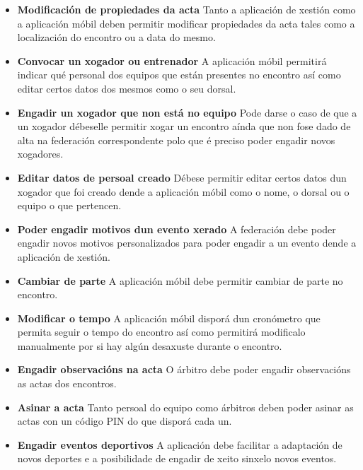     \begin{itemize}

    \item \textbf{Modificación de propiedades da acta}
    Tanto a aplicación de xestión como a aplicación móbil deben permitir 
modificar propiedades da acta tales como a localización do encontro ou a data 
do mesmo.

    \item \textbf{Convocar un xogador ou entrenador}
    A aplicación móbil permitirá indicar qué personal dos equipos que están 
presentes no encontro así como editar certos datos dos mesmos como o seu dorsal.

    \item \textbf{Engadir un xogador que non está no equipo}
    Pode darse o caso de que a un xogador débeselle permitir xogar un encontro 
aínda que non fose dado de alta na federación correspondente polo que é preciso 
poder engadir novos xogadores.

    \item \textbf{Editar datos de persoal creado}
    Débese permitir editar certos datos dun xogador que foi creado dende 
a aplicación móbil como o nome, o dorsal ou o equipo o que pertencen.

    \item \textbf{Poder engadir motivos dun evento xerado}
    A federación debe poder engadir novos motivos personalizados para poder 
engadir a un evento dende a aplicación de xestión.

    \item \textbf{Cambiar de parte}
    A aplicación móbil debe permitir cambiar de parte no encontro.

    \item \textbf{Modificar o tempo}
    A aplicación móbil disporá dun cronómetro que permita seguir o tempo do 
encontro así como permitirá modificalo manualmente por si hay algún desaxuste 
durante o encontro.

    \item \textbf{Engadir observacións na acta}
    O árbitro debe poder engadir observacións as actas dos encontros.

    \item \textbf{Asinar a acta}
    Tanto persoal do equipo como árbitros deben poder asinar as actas con un 
código PIN do que disporá cada un.

    \item \textbf{Engadir eventos deportivos}
    A aplicación debe facilitar a adaptación de novos deportes e a posibilidade 
de engadir de xeito sinxelo novos eventos.
    
    \end{itemize}

    
    